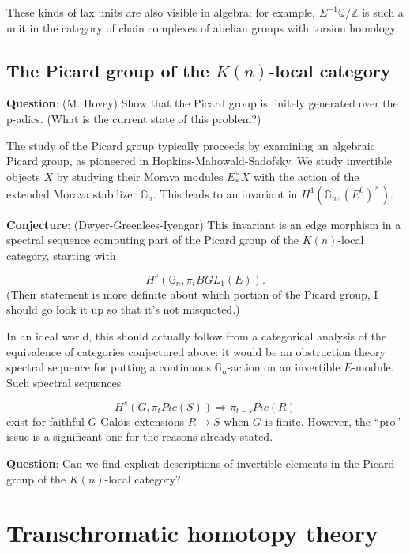 \documentclass[12pt,titlepage]{article}
\theoremstyle{plain}
\theoremstyle{definition}
\theoremstyle{remark}
\begin{document}
These kinds of lax units are also visible in algebra: for example, $\Sigma^{-1} \mathbb{Q}/\mathbb{Z}$ is such a unit in the category of chain complexes of abelian groups with torsion homology.

\hypertarget{the_picard_group_of_the_local_category_5}{}\subsection{{The Picard group of the $K(n)$-local category}}\label{the_picard_group_of_the_local_category_5}

\textbf{Question}: (M. Hovey) Show that the Picard group is finitely generated over the p-adics. (What is the current state of this problem?)

The study of the Picard group typically proceeds by examining an algebraic Picard group, as pioneered in Hopkins-Mahowald-Sadofsky. We study invertible objects $X$ by studying their Morava modules $E^\vee_* X$ with the action of the extended Morava stabilizer $\mathbb{G}_n$. This leads to an invariant in $H^1(\mathbb{G}_n,
(E^0)^\times)$.

\textbf{Conjecture}: (Dwyer-Greenlees-Iyengar) This invariant is an edge morphism in a spectral sequence computing part of the Picard group of the $K(n)$-local category, starting with

\begin{displaymath}
H^s(\mathbb{G}_n, \pi_t BGL_1(E)).
\end{displaymath}
(Their statement is more definite about which portion of the Picard group, I should go look it up so that it'{}s not misquoted.)

In an ideal world, this should actually follow from a categorical analysis of the equivalence of categories conjectured above: it would be an obstruction theory spectral sequence for putting a continuous $\mathbb{G}_n$-action on an invertible $E$-module. Such spectral sequences

\begin{displaymath}
H^s(G, \pi_t Pic(S)) \Rightarrow \pi_{t-s} Pic(R)
\end{displaymath}
exist for faithful $G$-Galois extensions $R \to S$ when $G$ is finite. However, the ``{}pro''{} issue is a significant one for the reasons already stated.

\textbf{Question}: Can we find explicit descriptions of invertible elements in the Picard group of the $K(n)$-local category?

\section{Transchromatic homotopy theory}
\end{document}
